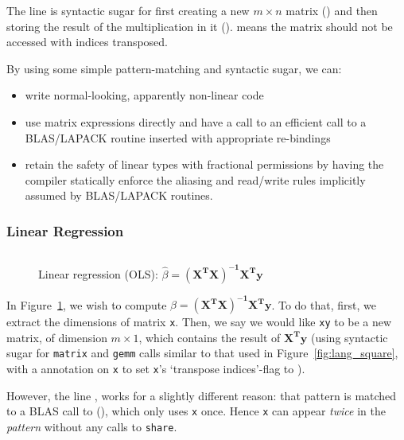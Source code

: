 The line  is syntactic sugar for
first creating a new $m \times n$ matrix () and
then storing the result of the multiplication in it ().  means
the matrix should not be accessed with indices transposed.

By using some simple pattern-matching and syntactic sugar, we can:
\begin{itemize}
    \item write normal-looking, apparently non-linear code
    \item use matrix expressions directly and have a call to an efficient
        call to a BLAS/LAPACK routine inserted with appropriate re-bindings
    \item retain the safety of linear types with fractional permissions by
        having the compiler statically enforce the aliasing and read/write rules
        implicitly assumed by BLAS/LAPACK routines.
\end{itemize}

\subsubsection{Linear Regression}

\begin{figure}[t]
    \centering
    \inputminted[fontsize=\small]{ocaml}{../../test/examples/lin_reg.lt}
    \caption{Linear regression (OLS): $\hat\beta =
        \mathbf{(X^T X)^{-1} X^T y}$}\label{fig:lang_lin_reg}
\end{figure}

In Figure~\ref{fig:lang_lin_reg}, we wish to compute $\hat\beta = \mathbf{(X^T
X)^{-1} X^T y}$. To do that, first, we extract the dimensions of matrix
\texttt{x}. Then, we say we would like \texttt{xy} to be a new matrix, of
dimension $m \times 1$, which contains the result of $\mathbf{X^T y}$ (using
syntactic sugar for \texttt{matrix} and \texttt{gemm} calls similar to that
used in Figure~\ref{fig:lang_square}, with a  annotation on
\texttt{x} to set \texttt{x}'s `transpose indices'-flag to ).

However, the line , works for a
slightly different reason: that pattern is matched to a BLAS call to
(), which only uses \texttt{x} once. Hence
\texttt{x} can appear \emph{twice} in the \emph{pattern} without any calls to
\texttt{share}.

